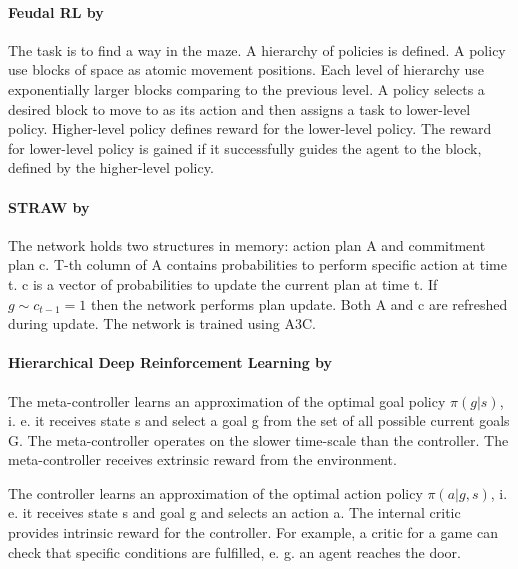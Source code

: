 \documentclass[acmsmall, nonacm]{acmart}
\begin{document}
\paragraph{Feudal RL by~\citet{Dayan1992FeudalRL}} %
\label{par:feudal_rl}

The task is to find a way in the maze. A hierarchy of policies is defined. A policy use blocks of space as atomic movement positions. Each level of hierarchy use exponentially larger blocks comparing to the previous level. A policy selects a desired block to move to as its action and then assigns a task to lower-level policy. Higher-level policy defines reward for the lower-level policy. The reward for lower-level policy is gained if it successfully guides the agent to the block, defined by the higher-level policy.


\paragraph{STRAW by~\citet{Vezhnevets2016StrategicAW}} %
\label{par:straw}

The network holds two structures in memory: action plan A and commitment plan c. T-th column of A contains probabilities to perform specific action at time t. c is a vector of probabilities to update the current plan at time t. If $g \sim c_{t-1} = 1$ then the network performs plan update. Both A and c are refreshed during update. The network is trained using A3C.


\paragraph{Hierarchical Deep Reinforcement Learning by~\citet{Kulkarni2016HierarchicalDR}} %
\label{par:hierarchical_deep_rl}

The meta-controller learns an approximation of the optimal goal policy $\pi(g|s)$, i. e. it receives state s and select a goal g from the set of all possible current goals G. The meta-controller operates on the slower time-scale than the controller. The meta-controller receives extrinsic reward from the environment.

The controller learns an approximation of the optimal action policy $\pi(a|g,s)$, i. e. it receives state s and goal g and selects an action a. The internal critic provides intrinsic reward for the controller. For example, a critic for a game can check that specific conditions are fulfilled, e. g. an agent reaches the door.
\end{document}
